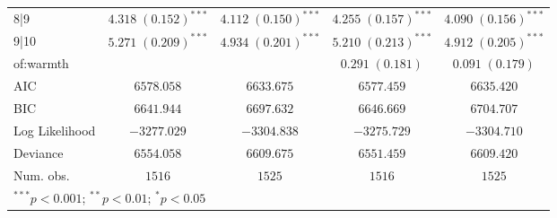 \documentclass[12pt,letterpaper]{article}
\begin{document}
\begin{table}[htbp]
\begin{center}
{\begin{tabular}{l c c c c}
			8|9                               & $4.318 \; (0.152)^{***}$  & $4.112 \; (0.150)^{***}$  & $4.255 \; (0.157)^{***}$  & $4.090 \; (0.156)^{***}$  \\
			9|10                              & $5.271 \; (0.209)^{***}$  & $4.934 \; (0.201)^{***}$  & $5.210 \; (0.213)^{***}$  & $4.912 \; (0.205)^{***}$  \\
			of:warmth &                           &                           & $0.291 \; (0.181)$        & $0.091 \; (0.179)$        \\
			\hline
			AIC                               & $6578.058$                & $6633.675$                & $6577.459$                & $6635.420$                \\
			BIC                               & $6641.944$                & $6697.632$                & $6646.669$                & $6704.707$                \\
			Log Likelihood                    & $-3277.029$               & $-3304.838$               & $-3275.729$               & $-3304.710$               \\
			Deviance                          & $6554.058$                & $6609.675$                & $6551.459$                & $6609.420$                \\
			Num. obs.                         & $1516$                    & $1525$                    & $1516$                    & $1525$                    \\
			\hline
			\multicolumn{5}{l}{\scriptsize{$^{***}p<0.001$; $^{**}p<0.01$; $^{*}p<0.05$}}
		\end{tabular}
	}
	\end{center}
	\end{table}
	\FloatBarrier
	
\end{document}
